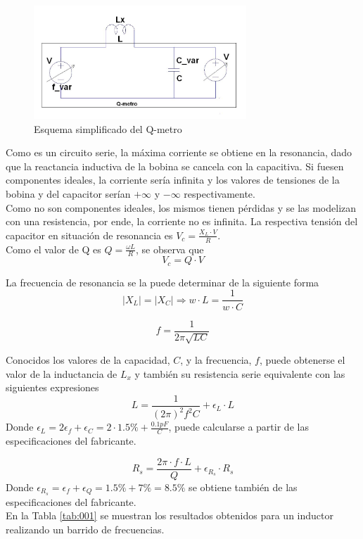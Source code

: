\documentclass[a4paper,10pt]{article}
\begin{document}
			\begin{figure}[!htb]
				\centering
				\includegraphics[width=8cm]
				{Imagenes/qmetro.png}
				\caption{Esquema simplificado del Q-metro}
				\label{img001} 
			\end{figure}
		\indent Como es un circuito serie, la máxima corriente se obtiene en 
		la resonancia, dado que la reactancia inductiva de la bobina se 
		cancela con la capacitiva. Si fuesen componentes ideales, la corriente
		sería infinita y los valores de tensiones de la bobina y del capacitor
		serían $+\infty$ y $-\infty$ respectivamente. \\
		\indent Como no son componentes ideales, los mismos tienen pérdidas y
		se las modelizan con una resistencia, por ende, la corriente no es 
		infinita. La respectiva tensión del capacitor en situación de 
		resonancia es $V_c = \frac{X_L\cdot V}{R}$. \\
		\indent Como el valor de Q es $Q=\frac{\omega L}{R}$, se observa que 
		$$V_c = Q \cdot V$$

		\indent La frecuencia de resonancia se la puede determinar de la 
		siguiente forma
		$$|X_L|=|X_C| \Rightarrow w\cdot L = \frac{1}{w\cdot C}$$

		$$f=\frac{1}{2\pi\sqrt{LC}}$$ 
		
		\indent Conocidos los valores de la capacidad, $C$, y la frecuencia, 
		$f$, puede obtenerse el valor de la inductancia de $L_x$ y tambi\'en 
		su resistencia serie equivalente con las siguientes expresiones
		$$L=\frac{1}{(2\pi)^2 f^2C}+\epsilon_L\cdot L$$
		Donde $\epsilon_L=2\epsilon_f+\epsilon_C=2\cdot 1.5\%+\frac{0.1pF}{C}$, 
		puede calcularse a partir de las especificaciones del  fabricante.
		
		$$R_s=\frac{2\pi\cdot f\cdot L}{Q}+\epsilon_{R_s}\cdot R_s$$
		Donde $\epsilon_{R_s}=\epsilon_f+\epsilon_Q= 1.5\%+ 7\%=8.5\%$ se 
		obtiene tambi\'en de las especificaciones del fabricante.
		\\
		\indent En la Tabla \ref{tab:001} se muestran los resultados obtenidos
		para un inductor realizando un barrido de frecuencias.
		
\end{document}
